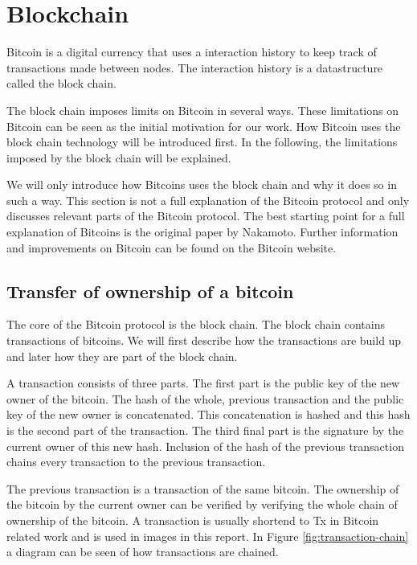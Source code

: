 \section{Blockchain}
\label{sect:bitcoin}
Bitcoin is a digital currency that uses a interaction history
to keep track of transactions made between nodes.
The interaction history is a datastructure called the block chain.

The block chain imposes limits on Bitcoin in several ways.
These limitations on Bitcoin can be seen as the initial motivation for our work.
How Bitcoin uses the block chain technology will be introduced first.
In the following, the limitations imposed by the block chain will be explained.

We will only introduce how Bitcoins uses the block chain and why it does so in such a way.
This section is not a full explanation of the Bitcoin protocol
and only discusses relevant parts of the Bitcoin protocol.
The best starting point for a full explanation of Bitcoins
is the original paper by Nakamoto\cite{Nakamoto-bitcoin}.
Further information and improvements on Bitcoin can be found on the Bitcoin website\cite{Bitcoin.org-site}.

\subsection{Transfer of ownership of a bitcoin}
The core of the Bitcoin protocol is the block chain.
The block chain contains transactions of bitcoins.
We will first describe how the transactions are build up
and later how they are part of the block chain.

A transaction consists of three parts.
The first part is the public key of the new owner of the bitcoin.
The hash of the whole, previous transaction and the public key of the new owner is concatenated.
This concatenation is hashed and this hash is the second part of the transaction.
The third final part is the signature by the current owner of this new hash.
Inclusion of the hash of the previous transaction chains every transaction to the previous transaction.

The previous transaction is a transaction of the same bitcoin.
The ownership of the bitcoin by the current owner can be verified
by verifying the whole chain of ownership of the bitcoin.
A transaction is usually shortend to Tx in Bitcoin related work and is used in images in this report.
In Figure \ref{fig:transaction-chain} a diagram can be seen of how transactions are chained.

